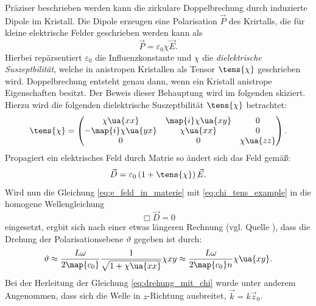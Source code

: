 Präziser beschrieben werden kann die zirkulare Doppelbrechung durch induzierte
Dipole im Kristall. Die Dipole erzeugen eine Polarisation $\vec{P}$ des Krirtalls,
die für kleine elektrische Felder geschrieben werden kann als
\begin{equation*}
\vec{P}=\varepsilon_0\chi\vec{E}.
\end{equation*}
Hierbei repärsentiert $\varepsilon_0$ die Influenzkonstante und $\chi$ die
\emph{dielektrische Suszeptbilität}, welche in anistropen Kristallen als
Tensor $\tens{\chi}$ geschrieben wird. Doppelbrechung entsteht genau dann, wenn
ein Kristall anistrope Eigenschaften besitzt. Der Beweis dieser Behauptung wird
im folgenden skiziert. Hierzu wird die folgenden dielektrische Suszeptbilität
 $\tens{\chi}$ betrachtet:
\begin{equation}
  \label{eq:chi_tens_example}
  \tens{\chi}=\begin{pmatrix} \chi\ua{xx} & \map{i}\chi\ua{xy} & 0 \\ -\map{i}\chi\ua{yx} & \chi\ua{xx} & 0 \\ 0 & 0 & \chi\ua{zz} \end{pmatrix}.
\end{equation}
Propagiert ein elektrisches Feld durch Matrie so ändert sich das Feld gemäß:
\begin{equation}
  \label{eq:e_feld_in_materie}
  \vec{D}=\varepsilon_0\left(1+\tens{\chi}\right)\vec{E}.
\end{equation}
Wird nun die Gleichung \eqref{eq:e_feld_in_materie} mit \eqref{eq:chi_tens_example}
in die homogene Wellengleichung
\begin{equation*}
  \Box \vec{D} = 0
\end{equation*}
eingesetzt, ergbit sich nach einer etwas längeren Rechnung (vgl. Quelle \cite{anleitungv46}),
dass die Drehung der Polarisationsebene $\vartheta$ gegeben ist durch:
\begin{equation}
  \label{eq:drehung_mit_chi}
  \vartheta \approx \frac{L\omega}{2\map{c_0}}\frac{1}{\sqrt{1+\chi\ua{xx}}}\chi{xy}\approx\frac{L\omega}{2\map{c_0}n}\chi\ua{xy}.
\end{equation}
Bei der Herleitung der Gleichung \eqref{eq:drehung_mit_chi} wurde unter anderem Angenommen,
dass sich die Welle in $z$-Richtung ausbreitet, $\vec{k}=k\vec{z}_0$.
